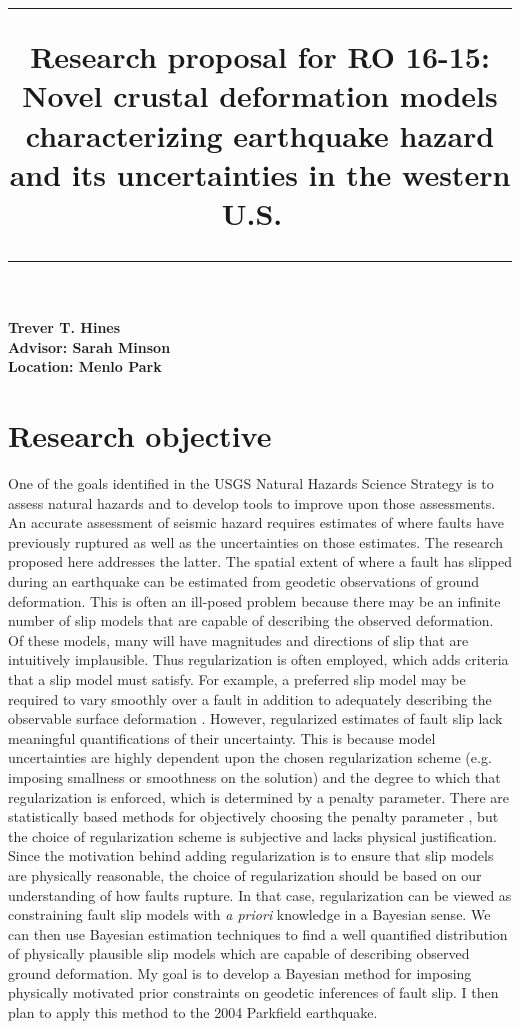 \documentclass[12pt]{article}
\title{	
 \Large 
 \rule{\headwidth}{1.0pt}
 \raggedright
 \textbf{Research proposal for RO 16-15:
 Novel crustal deformation models
 characterizing earthquake hazard and its uncertainties in the western U.S.}\
 \rule{\headwidth}{1.0pt} 
 \date{}
 \vspace{-8ex}}
\begin{document}
 
 \maketitle
 \thispagestyle{empty}
{\raggedright \large 
 \textbf{Trever T. Hines} \hfill\\
 \textbf{Advisor: Sarah Minson}\hfill\\
 \textbf{Location: Menlo Park}\hfill\\}

\section*{Research objective}

One of the goals identified in the USGS Natural Hazards Science Strategy is to assess natural hazards and to develop tools to improve upon those assessments.  An accurate assessment of seismic hazard requires estimates of where faults have previously ruptured as well as the uncertainties on those estimates.  The research proposed here addresses the latter.  The spatial extent of where a fault has slipped during an earthquake can be estimated from geodetic observations of ground deformation.  This is often an ill-posed problem because there may be an infinite number of slip models that are capable of describing the observed deformation. Of these models, many will have magnitudes and directions of slip that are intuitively implausible. Thus regularization is often employed, which adds criteria that a slip model must satisfy.  For example, a preferred slip model may be required to vary smoothly over a fault in addition to adequately describing the observable surface deformation \citep[e.g.][]{Du1992}.  However, regularized estimates of fault slip lack meaningful quantifications of their uncertainty.  This is because model uncertainties are highly dependent upon the chosen regularization scheme (e.g. imposing smallness or smoothness on the solution) and the degree to which that regularization is enforced, which is determined by a penalty parameter. There are statistically based methods for objectively choosing the penalty parameter \citep[e.g.][]{Yabuki1992,Fukuda2008}, but the choice of regularization scheme  is subjective and lacks physical justification.  Since the motivation behind adding regularization is to ensure that slip models are physically reasonable, the choice of regularization should be based on our understanding of how faults rupture.  In that case, regularization can be viewed as constraining fault slip models with \textit{a priori} knowledge in a Bayesian sense. We can then use Bayesian estimation techniques to find a well quantified distribution of physically plausible slip models which are capable of describing observed ground deformation.  My goal is to develop a Bayesian method for imposing physically motivated prior constraints on geodetic inferences of fault slip. I then plan to apply this method to the 2004 Parkfield earthquake.  
\end{document}
